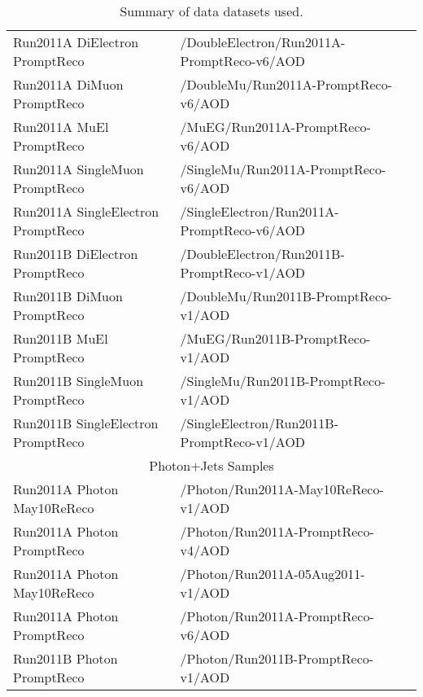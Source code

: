 \begin{table}[!ht]
\begin{center}
\begin{tabular}{|l|l|}
Run2011A DiElectron PromptReco      &  /DoubleElectron/Run2011A-PromptReco-v6/AOD   \\
Run2011A DiMuon PromptReco          &  /DoubleMu/Run2011A-PromptReco-v6/AOD   \\
Run2011A MuEl PromptReco            &  /MuEG/Run2011A-PromptReco-v6/AOD   \\
Run2011A SingleMuon PromptReco      &  /SingleMu/Run2011A-PromptReco-v6/AOD   \\
Run2011A SingleElectron PromptReco  &  /SingleElectron/Run2011A-PromptReco-v6/AOD   \\

Run2011B DiElectron PromptReco      &  /DoubleElectron/Run2011B-PromptReco-v1/AOD   \\
Run2011B DiMuon PromptReco          &  /DoubleMu/Run2011B-PromptReco-v1/AOD   \\
Run2011B MuEl PromptReco            &  /MuEG/Run2011B-PromptReco-v1/AOD   \\
Run2011B SingleMuon PromptReco      &  /SingleMu/Run2011B-PromptReco-v1/AOD   \\
Run2011B SingleElectron PromptReco  &  /SingleElectron/Run2011B-PromptReco-v1/AOD   \\
\hline
\hline
\multicolumn{2}{|c|}{Photon+Jets Samples} \\
\hline
Run2011A Photon May10ReReco         & /Photon/Run2011A-May10ReReco-v1/AOD \\
Run2011A Photon PromptReco          & /Photon/Run2011A-PromptReco-v4/AOD \\
Run2011A Photon May10ReReco         & /Photon/Run2011A-05Aug2011-v1/AOD \\
Run2011A Photon PromptReco          & /Photon/Run2011A-PromptReco-v6/AOD \\
Run2011B Photon PromptReco          & /Photon/Run2011B-PromptReco-v1/AOD \\

\hline
\end{tabular}
\caption{Summary of data datasets used.}
\label{tab:DatasetsData}
\end{center}
\end{table}

